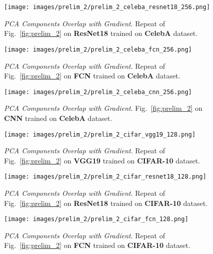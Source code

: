 \begin{figure}[h!]
  \centering
  \centerline{\texttt{[image: images/prelim\_2/prelim\_2\_celeba\_resnet18\_256.png]}}
  \caption{\small{\textit{PCA Components Overlap with Gradient}. Repeat of Fig.~\ref{fig:prelim_2} on \textbf{ResNet18} trained on \textbf{CelebA} dataset.}}
  \label{fig:prelim_2_celeba_resnet18}
\end{figure}

\begin{figure}[h!]
  \centering
  \centerline{\texttt{[image: images/prelim\_2/prelim\_2\_celeba\_fcn\_256.png]}}
  \caption{\small{\textit{PCA Components Overlap with Gradient}. Repeat of Fig.~\ref{fig:prelim_2} on \textbf{FCN} trained on \textbf{CelebA} dataset.}}
  \label{fig:prelim_2_celeba_fcn}
\end{figure}

\begin{figure}[h!]
  \centering
  \centerline{\texttt{[image: images/prelim\_2/prelim\_2\_celeba\_cnn\_256.png]}}
  \caption{\small{\textit{PCA Components Overlap with Gradient}. Fig.~\ref{fig:prelim_2} on \textbf{CNN} trained on \textbf{CelebA} dataset.}}
  \label{fig:prelim_2_celeba_cnn}
\end{figure}


\clearpage

\begin{figure}[h!]
  \centering
  \centerline{\texttt{[image: images/prelim\_2/prelim\_2\_cifar\_vgg19\_128.png]}}
  \caption{\small{\textit{PCA Components Overlap with Gradient}. Repeat of Fig.~\ref{fig:prelim_2} on \textbf{VGG19} trained on \textbf{CIFAR-10} dataset.}}
  \label{fig:prelim_2_cifar_vgg19}
\end{figure}

\begin{figure}[h!]
  \centering
  \centerline{\texttt{[image: images/prelim\_2/prelim\_2\_cifar\_resnet18\_128.png]}}
  \caption{\small{\textit{PCA Components Overlap with Gradient}. Repeat of Fig.~\ref{fig:prelim_2} on \textbf{ResNet18} trained on \textbf{CIFAR-10} dataset.}}
  \label{fig:prelim_2_cifar_resnet18}
\end{figure}

\begin{figure}[h!]
  \centering
  \centerline{\texttt{[image: images/prelim\_2/prelim\_2\_cifar\_fcn\_128.png]}}
  \caption{\small{\textit{PCA Components Overlap with Gradient}. Repeat of Fig.~\ref{fig:prelim_2} on \textbf{FCN} trained on \textbf{CIFAR-10} dataset.}}
  \label{fig:prelim_2_cifar_fcn}
\end{figure}

